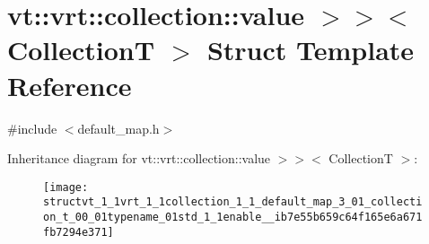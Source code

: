\hypertarget{structvt_1_1vrt_1_1collection_1_1_default_map_3_01_collection_t_00_01typename_01std_1_1enable__ib7e55b659c64f165e6a671fb7294e371}{}\section{vt\+:\+:vrt\+:\+:collection\+:\+:value $>$$>$$<$ CollectionT $>$ Struct Template Reference}
\label{structvt_1_1vrt_1_1collection_1_1_default_map_3_01_collection_t_00_01typename_01std_1_1enable__ib7e55b659c64f165e6a671fb7294e371}


{\ttfamily \#include $<$default\+\_\+map.\+h$>$}

Inheritance diagram for vt\+:\+:vrt\+:\+:collection\+:\+:value $>$$>$$<$ CollectionT $>$\+:\begin{figure}[H]
\begin{center}
\leavevmode
\texttt{[image: structvt\_1\_1vrt\_1\_1collection\_1\_1\_default\_map\_3\_01\_collection\_t\_00\_01typename\_01std\_1\_1enable\_\_ib7e55b659c64f165e6a671fb7294e371]}
\end{center}
\end{figure}
